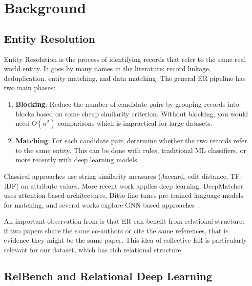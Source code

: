 \documentclass{article}
\begin{document}
\section{Background}
\label{sec:background}

\subsection{Entity Resolution}

Entity Resolution is the process of identifying records that refer to the same real world entity.
It goes by many names in the literature: record linkage, deduplication, entity matching, and data matching.
The general ER pipeline has two main phases:

\begin{enumerate}
    \item \textbf{Blocking}: Reduce the number of candidate pairs by grouping records into blocks based on some cheap similarity criterion. Without blocking, you would need $O(n^2)$ comparisons which is impractical for large datasets.
    \item \textbf{Matching}: For each candidate pair, determine whether the two records refer to the same entity. This can be done with rules, traditional ML classifiers, or more recently with deep learning models.
\end{enumerate}

Classical approaches use string similarity measures (Jaccard, edit distance, TF-IDF) on attribute values.
More recent work applies deep learning: DeepMatcher \citep{mudgal2018deepmatcher} uses attention based architectures, Ditto \citep{li2020ditto} fine tunes pre-trained language models for matching, and several works explore GNN based approaches \citep{loster2021grapher, yao2022hiergat}.

An important observation from \citet{bhattacharya2007collective} is that ER can benefit from relational structure: if two papers share the same co-authors or cite the same references, that is evidence they might be the same paper.
This idea of collective ER is particularly relevant for our dataset, which has rich relational structure.

\subsection{RelBench and Relational Deep Learning}
\end{document}
